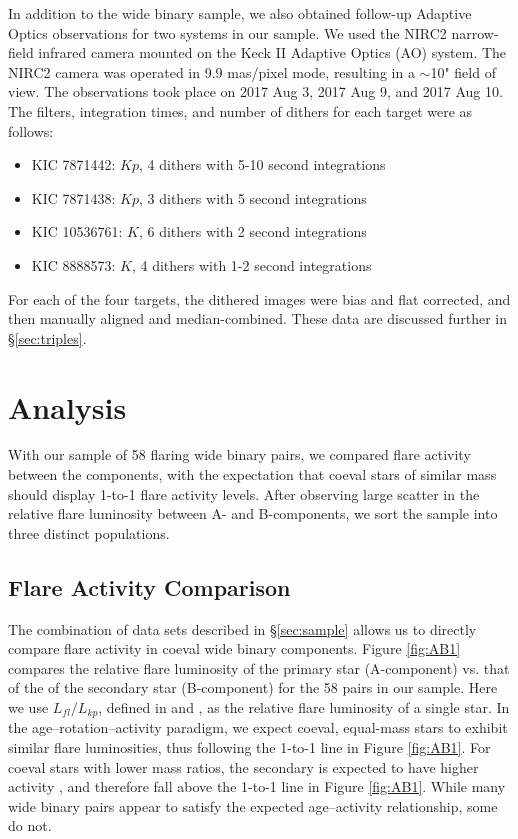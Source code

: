 \documentclass[preprint2]{aastex61}
\begin{document}
In addition to the wide binary sample, we also obtained follow-up Adaptive Optics observations for two systems in our sample. We used the NIRC2 narrow-field infrared camera mounted on the Keck II Adaptive Optics (AO) system. The NIRC2 camera was operated in 9.9 mas/pixel mode, resulting in a $\sim$10" field of view. The observations took place on 2017 Aug 3, 2017 Aug 9, and 2017 Aug 10. The filters, integration times, and number of dithers for each target were as follows: 
\begin{itemize}
    \item KIC 7871442: $Kp$, 4 dithers with 5-10 second integrations
    \item KIC 7871438: $Kp$, 3 dithers with 5 second integrations
    \item KIC 10536761: $K$, 6 dithers with 2 second integrations
    \item KIC 8888573: $K$, 4 dithers with 1-2 second integrations
\end{itemize}
For each of the four targets, the dithered images were bias and flat corrected, and then manually aligned and median-combined. These data are discussed further in \S\ref{sec:triples}.

\section{Analysis}
\label{sec:analysis}

With our sample of 58 flaring wide binary pairs, we compared flare activity between the components, with the expectation that coeval stars of similar mass should display 1-to-1 flare activity levels. After observing large scatter in the relative flare luminosity between A- and B-components, we sort the sample into three distinct populations.


\subsection{Flare Activity Comparison}

The combination of data sets described in \S\ref{sec:sample} allows us to directly compare flare activity in coeval wide binary components. Figure \ref{fig:AB1} compares the relative flare luminosity of the primary star (A-component) vs. that of the of the secondary star (B-component) for the 58 pairs in our sample. Here we use $L_{fl}/L_{kp}$, defined in \citet{lurie2015} and \citet{davenport2016}, as the relative flare luminosity of a single star. In the age--rotation--activity paradigm, we expect coeval, equal-mass stars to exhibit similar flare luminosities, thus following the 1-to-1 line in Figure \ref{fig:AB1}. For coeval stars with lower mass ratios, the secondary is expected to have higher activity \citep[e.g.][]{west2008,douglas2014}, and therefore fall above the 1-to-1 line in Figure \ref{fig:AB1}. While many wide binary pairs appear to satisfy the expected age--activity relationship, some do not. 
\end{document}
